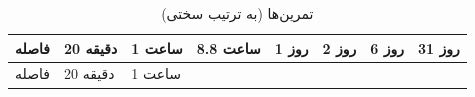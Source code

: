 \begin{landscape}\small
\begin{longtable}[]{@{}
  >{\raggedright\arraybackslash}p{}
  >{\raggedright\arraybackslash}p{}
  >{\raggedright\arraybackslash}p{}
  >{\raggedright\arraybackslash}p{}
  >{\raggedright\arraybackslash}p{}
  >{\raggedright\arraybackslash}p{}
  >{\raggedright\arraybackslash}p{}
  >{\raggedright\arraybackslash}p{}@{}}
\caption{\centering تمرین‌ها (به ترتیب سختی)}\tabularnewline
\toprule\noalign{}
\begin{minipage}[b]{\linewidth}\raggedright
فاصله
\end{minipage} & \begin{minipage}[b]{\linewidth}\raggedright
20 دقیقه
\end{minipage} & \begin{minipage}[b]{\linewidth}\raggedright
1 ساعت
\end{minipage} & \begin{minipage}[b]{\linewidth}\raggedright
8.8 ساعت
\end{minipage} & \begin{minipage}[b]{\linewidth}\raggedright
1 روز
\end{minipage} & \begin{minipage}[b]{\linewidth}\raggedright
2 روز
\end{minipage} & \begin{minipage}[b]{\linewidth}\raggedright
6 روز
\end{minipage} & \begin{minipage}[b]{\linewidth}\raggedright
31 روز
\end{minipage} \\
\midrule\noalign{}
\endfirsthead
\toprule\noalign{}
\begin{minipage}[b]{\linewidth}\raggedright
فاصله
\end{minipage} & \begin{minipage}[b]{\linewidth}\raggedright
20 دقیقه
\end{minipage} & \begin{minipage}[b]{\linewidth}\raggedright
1 ساعت
\end{minipage} & \begin{minipage}[b]{\linewidth}\raggedright

\end{minipage}
\end{longtable}
\end{landscape}
